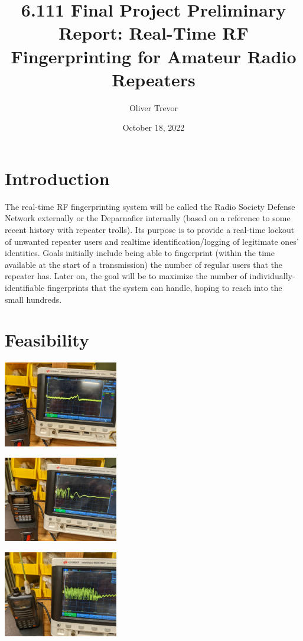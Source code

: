 \documentclass{article}
\title{6.111 Final Project Preliminary Report: Real-Time RF Fingerprinting for Amateur Radio Repeaters}
\author{Oliver Trevor}
\date{October 18, 2022}
\begin{document}
\maketitle

\section{Introduction}

The real-time RF fingerprinting system will be called the Radio Society Defense Network externally or the Deparnafier internally (based on a reference to some recent history with repeater trolls). Its purpose is to provide a real-time lockout of unwanted repeater users and realtime identification/logging of legitimate ones' identities. Goals initially include being able to fingerprint (within the time available at the start of a transmission) the number of regular users that the repeater has. Later on, the goal will be to maximize the number of individually-identifiable fingerprints that the system can handle, hoping to reach into the small hundreds.

\section{Feasibility}

\includegraphics[width=5cm]{Yaesu_FT3D_Fingerprint.jpg}

\includegraphics[width=5cm]{Yaesu_FT70D_Fingerprint.jpg}

\includegraphics[width=5cm]{First_Yaesu_FT50_Fingerprint.jpg}
\end{document}
